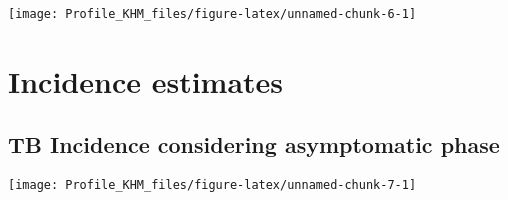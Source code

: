 \documentclass[
]{article}
\begin{document}
\texttt{[image: Profile\_KHM\_files/figure-latex/unnamed-chunk-6-1]}

\hypertarget{incidence-estimates}{%
\section{Incidence estimates}\label{incidence-estimates}}

\hypertarget{tb-incidence-considering-asymptomatic-phase}{%
\subsection{TB Incidence considering asymptomatic
phase}\label{tb-incidence-considering-asymptomatic-phase}}

\texttt{[image: Profile\_KHM\_files/figure-latex/unnamed-chunk-7-1]}
\end{document}
